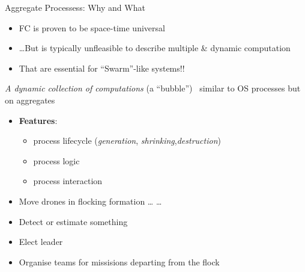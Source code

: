 \documentclass[8pt, aspectratio=169, handout]{beamer}
\begin{document}
\begin{frame}[allowframebreaks]{Aggregate Processess: Why and What}
  \begin{card}[Why?]
    \begin{itemize}
      \item FC is proven to be space-time universal
      \item \dots But is typically unfleasible to describe multiple \& dynamic computation
      \item[\faArrowRight] That are essential for ``Swarm''-like systems!! 
    \end{itemize}
  \end{card}
  \begin{card}
    \emph{A dynamic collection of computations} (a ``bubble'') \faArrowRight \, similar to OS processes but on aggregates
    \begin{itemize}
      \item \textbf{Features}:
      \begin{itemize}
        \item process lifecycle (\emph{generation}, \emph{shrinking},\emph{destruction})
        \item process logic
        \item process interaction
      \end{itemize}
    \end{itemize}
  \end{card}
  \begin{card}
    \begin{itemize}
      \item Move drones in flocking formation \dots {} \dots
      \item Detect or estimate something
      \item Elect leader
      \item Organise teams for missisions departing from the flock
    \end{itemize}
  \end{card}
  \centering
  \begin{multicols*}{3}
  \end{multicols*}
\end{frame}
\end{document}

